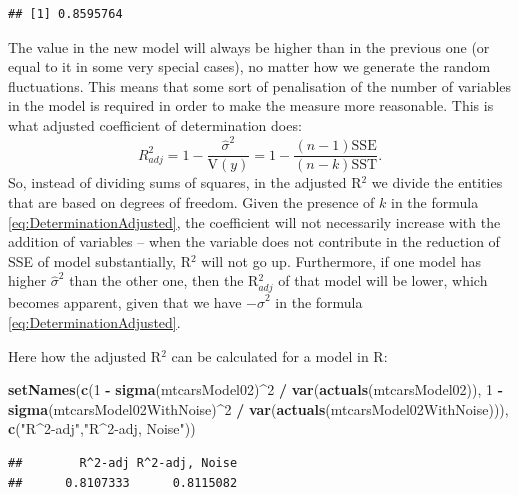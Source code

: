 \documentclass[
]{book}
\newenvironment{Shaded}{\begin{snugshade}}{\end{snugshade}}
\newcommand{\DecValTok}[1]{\textcolor[rgb]{0.00,0.00,0.81}{#1}}
\newcommand{\KeywordTok}[1]{\textcolor[rgb]{0.13,0.29,0.53}{\textbf{#1}}}
\newcommand{\NormalTok}[1]{#1}
\newcommand{\OperatorTok}[1]{\textcolor[rgb]{0.81,0.36,0.00}{\textbf{#1}}}
\newcommand{\StringTok}[1]{\textcolor[rgb]{0.31,0.60,0.02}{#1}}
\theoremstyle{definition}
\theoremstyle{definition}
\theoremstyle{definition}
\theoremstyle{definition}
\theoremstyle{remark}
\begin{document}
\begin{verbatim}
## [1] 0.8595764
\end{verbatim}

The value in the new model will always be higher than in the previous one (or equal to it in some very special cases), no matter how we generate the random fluctuations. This means that some sort of penalisation of the number of variables in the model is required in order to make the measure more reasonable. This is what adjusted coefficient of determination does:
\begin{equation}
    R^2_{adj} = 1 - \frac{\hat{\sigma}^2}{\mathrm{V}(y)} = 1 - \frac{(n-1)\mathrm{SSE}}{(n-k)\mathrm{SST}} .
    \label{eq:DeterminationAdjusted}
\end{equation}
So, instead of dividing sums of squares, in the adjusted R\(^2\) we divide the entities that are based on degrees of freedom. Given the presence of \(k\) in the formula \eqref{eq:DeterminationAdjusted}, the coefficient will not necessarily increase with the addition of variables -- when the variable does not contribute in the reduction of SSE of model substantially, R\(^2\) will not go up. Furthermore, if one model has higher \(\hat{\sigma}^2\) than the other one, then the R\(^2_{adj}\) of that model will be lower, which becomes apparent, given that we have \(-\hat{\sigma}^2\) in the formula \eqref{eq:DeterminationAdjusted}.

Here how the adjusted R\(^2\) can be calculated for a model in R:

\begin{Shaded}
\begin{Highlighting}[]
\KeywordTok{setNames}\NormalTok{(}\KeywordTok{c}\NormalTok{(}\DecValTok{1} \OperatorTok{{-}}\StringTok{ }\KeywordTok{sigma}\NormalTok{(mtcarsModel02)}\OperatorTok{\^{}}\DecValTok{2} \OperatorTok{/}\StringTok{ }\KeywordTok{var}\NormalTok{(}\KeywordTok{actuals}\NormalTok{(mtcarsModel02)),}
           \DecValTok{1} \OperatorTok{{-}}\StringTok{ }\KeywordTok{sigma}\NormalTok{(mtcarsModel02WithNoise)}\OperatorTok{\^{}}\DecValTok{2} \OperatorTok{/}\StringTok{ }\KeywordTok{var}\NormalTok{(}\KeywordTok{actuals}\NormalTok{(mtcarsModel02WithNoise))),}
         \KeywordTok{c}\NormalTok{(}\StringTok{"R\^{}2{-}adj"}\NormalTok{,}\StringTok{"R\^{}2{-}adj, Noise"}\NormalTok{))}
\end{Highlighting}
\end{Shaded}

\begin{verbatim}
##        R^2-adj R^2-adj, Noise 
##      0.8107333      0.8115082
\end{verbatim}
\end{document}
